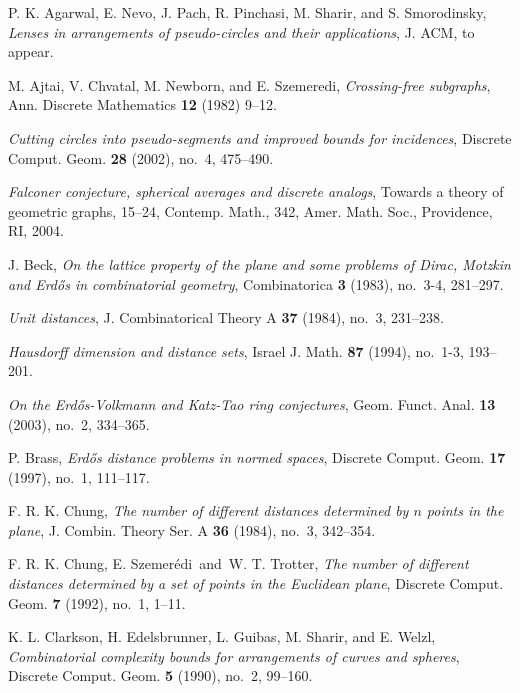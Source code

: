 \documentclass[]{stml-l}
\numberwithin{equation}{chapter}
\theoremstyle{plain}
\theoremstyle{definition}
\theoremstyle{remark}
\begin{document}
\begin{thebibliography}{55}

 P. K. Agarwal, E. Nevo, J. Pach,
R. Pinchasi, M. Sharir, and S. Smorodinsky,
{\it Lenses in arrangements of pseudo-circles
and their applications}, J. ACM, to appear.

 M. Ajtai, V. Chvatal, M. Newborn,
and E. Szemeredi, {\it Crossing-free subgraphs},
Ann. Discrete Mathematics {\bf 12} (1982) 9--12.

{\it Cutting circles into pseudo-segments and
improved bounds for incidences}, Discrete Comput.
Geom. {\bf 28} (2002), no.~4, 475--490.

{\it Falconer conjecture, spherical averages and
discrete analogs}, Towards a theory of geometric
graphs, 15--24, Contemp. Math., 342, Amer. Math.
Soc., Providence, RI, 2004.

 J. Beck, {\it On the lattice property
of the plane and some problems of Dirac, Motzkin and
Erd\H{o}s in combinatorial geometry}, Combinatorica
{\bf 3} (1983), no.~3-4, 281--297.

{\it Unit distances}, J. Combinatorical Theory
A {\bf 37} (1984), no.~3, 231--238.

{\it Hausdorff dimension and distance sets}, Israel J. Math.
{\bf
87} (1994), no.~1-3, 193--201.

{\it On the Erd\H{o}s-Volkmann and Katz-Tao ring conjectures},
Geom. Funct. Anal. {\bf 13} (2003), no.~2, 334--365.

 P. Brass, {\it Erd\H{o}s distance
problems in normed spaces}, Discrete Comput. Geom.
{\bf 17} (1997), no.~1, 111--117.

F. R. K. Chung, {\it The number of
different distances determined by $n$ points
in the plane}, J. Combin. Theory Ser. A {\bf 36}
(1984), no.~3, 342--354.


 F. R. K. Chung, E. Szemer\'edi\ and\
W. T. Trotter, {\it The number of different distances
determined by a set of points in the Euclidean plane},
Discrete Comput. Geom. {\bf 7} (1992), no.~1, 1--11.

 K. L. Clarkson, H. Edelsbrunner, L. Guibas,
M. Sharir, and E. Welzl, {\it Combinatorial complexity
bounds for arrangements of curves and spheres}, Discrete
Comput. Geom.
{\bf 5} (1990), no.~2, 99--160.


\end{thebibliography}
\end{document}
